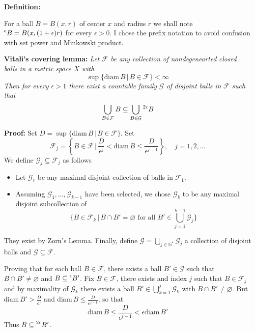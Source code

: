 \documentclass{article}
\begin{document}
\vspace{2ex}
\textbf{Definition:} 

\vspace{2ex}
For a ball $B=B(x, r)$ of center $x$ and radius $r$ we shall note $\prescript{\epsilon}{}B
=B(x, (1+\epsilon)r)$ for every $\epsilon>0$. I chose the prefix notation to
avoid confusion with set power and Minkowski product.

\vspace{1ex}
\textbf{Vitali's covering lemma:} \textit{
Let $\mathcal{F}$ be any collection of nondegenearted closed balls in a metric
space $X$ with
\[ \sup\{\text{diam}\,B\,|\, B\in\mathcal{F}\}<\infty \]
Then for every $\epsilon>1$ there exist a countable family $\mathcal{G}$ of
disjoint balls in $\mathcal{F}$ such that
\[\bigcup_{B\in\mathcal{F}}B\subseteq\bigcup_{B\in\mathcal{G}}\prescript{2\epsilon}{}B\]}

\vspace{1ex}
\textbf{Proof:}
Set $D=\sup\{\text{diam}\,B\,|\,B\in \mathcal{F}\}$. Set
\[\mathcal{F}_j=\left\{B\in\mathcal{F}\,|\,\frac{D}{\epsilon^j}<\text{diam}\,B\leq\frac{D}{\epsilon^{j-1}}\right\},\quad j=1,2,\ldots\]
We define $\mathcal{G}_j\subseteq\mathcal{F}_j$ as follows
\begin{itemize}
    \item Let $\mathcal{G}_1$ be any maximal disjoint collection of balls in
        $\mathcal{F}_1$.

    \item Assuming $\mathcal{G}_1,\ldots,\mathcal{G}_{k-1}$ have been selected,
        we chose $\mathcal{G}_k$ to be any maximal disjoint subcollection of
        \[ \{B\in\mathcal{F}_k\,|\,B\cap B'=\varnothing\text{ for all }B'\in\bigcup_{j=1}^{k-1}\mathcal{G}_j\}\]
\end{itemize}
They exist by Zorn's Lemma. Finally, define $\mathcal{G}=\bigcup_{j\in\mathbb{N}^*}\mathcal{G}_j$
a collection of disjoint balls and $\mathcal{G}\subseteq\mathcal{F}$.

\vspace{1ex}
Proving that for each ball $B\in\mathcal{F}$, there exists a ball $B'\in\mathcal{G}$
such that $B\cap B'\neq\varnothing$ and $B\subseteq\prescript{\epsilon}{}B'$. Fix
$B\in\mathcal{F}$, there exists and index $j$ such that $B\in\mathcal{F}_j$ and
by maximality of $\mathcal{G}_k$ there exists a ball $B'\in\bigcup_{k=1}^j
\mathcal{G}_k$ with $B\cap B'\neq\varnothing$. But $\text{diam}\,B'>\frac{D}{\epsilon^j}$
and $\text{diam}\,B\leq\frac{D}{\epsilon^{j-1}}$; so that
\[ \text{diam}\,B\leq \frac{D}{\epsilon^{j-1}} < \epsilon\text{diam}\,B'\]
Thus $B\subseteq\prescript{2\epsilon}{}B'$.
\end{document}
